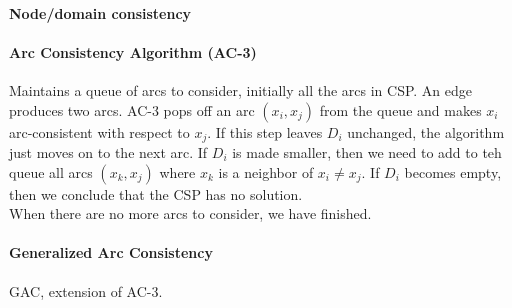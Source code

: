 \documentclass[10pt]{report}
\begin{document}
\paragraph{Node/domain consistency}
\paragraph{Arc Consistency Algorithm (AC-3)} Maintains a queue of arcs to consider, initially all the arcs in CSP. An edge produces two arcs. AC-3 pops off an arc $(x_i, x_j)$ from the queue and makes $x_i$ arc-consistent with respect to $x_j$. If this step leaves $D_i$ unchanged, the algorithm just moves on to the next arc. If $D_i$ is made smaller, then we need to add to teh queue all arcs $(x_k, x_j)$ where $x_k$ is a neighbor of $x_i \neq x_j$. If $D_i$ becomes empty, then we conclude that the CSP has no solution.\\
When there are no more arcs to consider, we have finished.
\paragraph{Generalized Arc Consistency} GAC, extension of AC-3.
\end{document}
